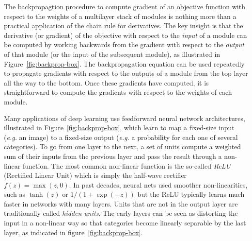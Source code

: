 \documentclass[10pts]{article}
\newcommand{\deri}[2]{\frac{\partial  #1}{\partial #2}}
\begin{document}
The backpropagtion procedure to compute gradient of an objective
function with respect to the weights of a multilayer stack of modules
is nothing more than a practical application of the chain rule for
derivatives. The key insight is that the derivative (or gradient) of
the objective with respect to the {\it input} of a module can be
computed by working backwards from the gradient with respect to the
{\em output} of that module (or the input of the subsequent
module), as illustrated in Figure~\ref{fig:backprop-box}.
The backpropagation equation can be used repeatedly to propagate
gradients with respect to the outputs of a module from the top layer all the way to the bottom. Once these
gradients have  computed, it is straightforward to compute the gradients with
respect to the weights of each module. 


Many applications of deep learning use feedforward neural network
architectures, illustrated in Figure~\ref{fig:backprop-box}, which
learn to map a fixed-size input ({\it e.g.} an image) to a fixed-size
output ({\it e.g.} a probability for each one of several categories). To go
from one layer to the next, a set of units compute a weighted
sum of their inputs from the previous layer and pass the result
through a non-linear function. The most common non-linear function is
the so-called {\em ReLU} (Rectified Linear Unit) which is simply the
half-wave rectifier $f(z) = \max(z,0)$. In past decades, neural nets
used smoother non-linearities, such as $\tanh(z)$ or $1/(1+\exp(-z))$ but the ReLU 
typically learns much faster in networks with many layers. Units that are not in the
output layer are traditionally called {\em hidden units}. The early
layers can be seen as distorting the input in a non-linear way so that
categories become linearly separable by the last layer, as indicated
in figure~\ref{fig:backprop-box}.
\end{document}

